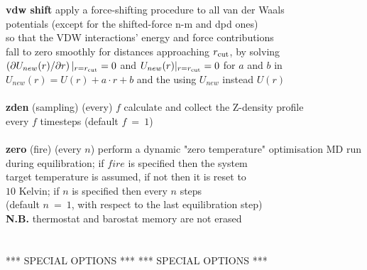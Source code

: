 \begin{tabbing}
\> {\bf vdw shift}                              \> apply a force-shifting procedure to all van der Waals \\
\>                                              \> potentials (except for the shifted-force n-m and dpd ones) \\
\>                                              \> so that the VDW interactions' energy and force contributions \\
\>                                              \> fall to zero smoothly for distances approaching $r_{\rm cut}$, by solving \\
\>                                              \> $\left(\partial U_{new}(r) / \partial r \right)|_{r = r_{\rm cut}} = 0$ and $U_{new}(r)|_{r=r_{\rm cut}}= 0$ for $a$ and $b$ in \\
\>                                              \> $U_{new}(r) = U(r) + a \cdot r + b$ and the using $U_{new}$ instead $U(r)$ \\
\>                                              \> \\
\> {\bf zden} (sampling) (every) $f$            \> calculate and collect the Z-density profile \\
\>                                              \> every $f$ timesteps (default $f~=~1$) \\
\>                                              \> \\
\> {\bf zero} (fire) (every $n$)                \> perform a dynamic "zero temperature" optimisation MD run \\
\>                                              \> during equilibration; if $fire$ is specified then the system \\
\>                                              \> target temperature is assumed, if not then it is reset to \\
\>                                              \> $10$ Kelvin; if $n$ is specified then every $n$ steps \\
\>                                              \> (default $n~=~1$, with respect to the last equilibration step) \\
\>                                              \> {\bf N.B.} thermostat and barostat memory are not erased \\
\>                                              \> \\
\>                                              \> \\
\> *** SPECIAL OPTIONS ***                      \> *** SPECIAL OPTIONS *** \\

\end{tabbing}

